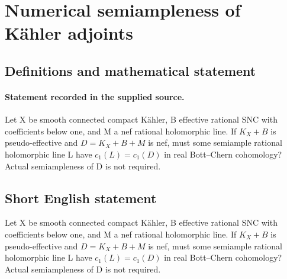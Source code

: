 \documentclass[11pt]{article}
\begin{document}
\section*{Numerical semiampleness of Kähler adjoints}\label{statement}
\subsection{Definitions and mathematical statement}
\paragraph{Statement recorded in the supplied source.}
Let X be smooth connected compact Kähler, B effective rational SNC with coefficients below one, and M a nef rational holomorphic line. If $K_X+B$ is pseudo-effective and $D=K_X+B+M$ is nef, must some semiample rational holomorphic line L have $c_{1}(L)=c_{1}(D)$ in real Bott–Chern cohomology? Actual semiampleness of D is not required.
\subsection{Short English statement}
Let X be smooth connected compact Kähler, B effective rational SNC with coefficients below one, and M a nef rational holomorphic line. If $K_X+B$ is pseudo-effective and $D=K_X+B+M$ is nef, must some semiample rational holomorphic line L have $c_{1}(L)=c_{1}(D)$ in real Bott–Chern cohomology? Actual semiampleness of D is not required.
\end{document}
